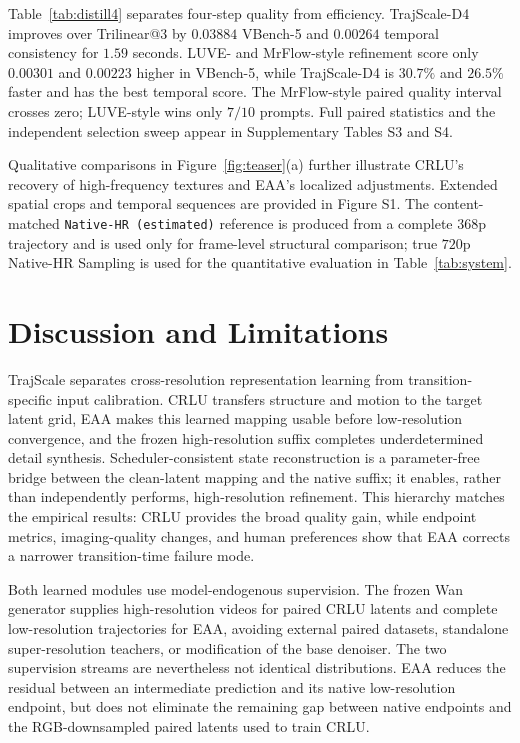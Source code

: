 Table~\ref{tab:distill4} separates four-step quality from efficiency.
TrajScale-D4 improves over Trilinear@3 by \(0.03884\) VBench-5 and
\(0.00264\) temporal consistency for \(1.59\) seconds. LUVE- and MrFlow-style
refinement score only \(0.00301\) and \(0.00223\) higher in VBench-5, while
TrajScale-D4 is \(30.7\%\) and \(26.5\%\) faster and has the best temporal
score. The MrFlow-style paired quality interval crosses zero; LUVE-style wins
only \(7/10\) prompts. Full paired statistics and the independent selection
sweep appear in Supplementary Tables S3 and S4.

Qualitative comparisons in Figure~\ref{fig:teaser}(a) further illustrate
CRLU's recovery of high-frequency textures and EAA's localized adjustments.
Extended spatial crops and temporal sequences are provided in Figure S1. The
content-matched \texttt{Native-HR (estimated)} reference is produced from a
complete \(368\text{p}\) trajectory and is used only for frame-level
structural comparison; true \(720\text{p}\) Native-HR Sampling is used for
the quantitative evaluation in Table~\ref{tab:system}.

\section{Discussion and Limitations}

TrajScale separates cross-resolution representation learning from
transition-specific input calibration. CRLU transfers structure and motion to
the target latent grid, EAA makes this learned mapping usable before
low-resolution convergence, and the frozen high-resolution suffix completes
underdetermined detail synthesis. Scheduler-consistent state reconstruction is
a parameter-free bridge between the clean-latent mapping and the native suffix;
it enables, rather than independently performs, high-resolution refinement.
This hierarchy matches the empirical results: CRLU provides the broad quality
gain, while endpoint metrics, imaging-quality changes, and human preferences
show that EAA corrects a narrower transition-time failure mode.

Both learned modules use model-endogenous supervision. The frozen Wan generator
supplies high-resolution videos for paired CRLU latents and complete
low-resolution trajectories for EAA, avoiding external paired datasets,
standalone super-resolution teachers, or modification of the base denoiser.
The two supervision streams are nevertheless not identical distributions. EAA
reduces the residual between an intermediate prediction and its native
low-resolution endpoint, but does not eliminate the remaining gap between
native endpoints and the RGB-downsampled paired latents used to train CRLU.

